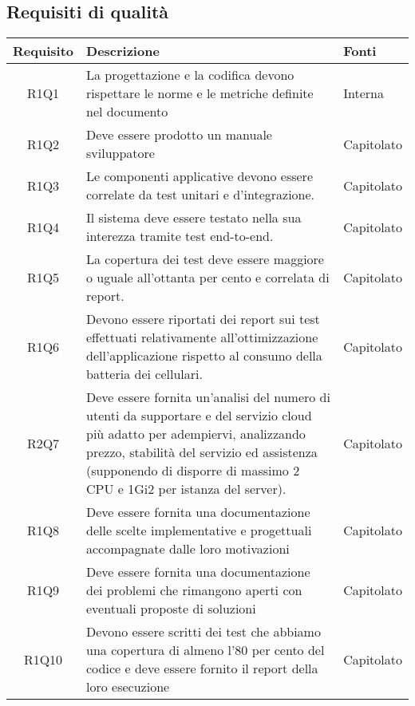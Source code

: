 \subsection{Requisiti di qualità}
\begin{center}
	\begin{longtable}{|c|p{10cm}|p{4cm}|}
		\hline
		\rowcolor{lighter-grayer}
		\textbf{Requisito} & \textbf{Descrizione} & \textbf{Fonti}  \\
		\hline
		\endhead
		
		 R1Q1 &La progettazione e la codifica devono rispettare le norme e le metriche definite nel documento \dext{Piano di qualifica v1.0.0} & Interna\\
		\hline	
		R1Q2 &Deve essere prodotto un manuale sviluppatore & Capitolato\\
		\hline
		R1Q3 &Le componenti applicative devono essere correlate da test unitari e d’integrazione. & Capitolato\\
		\hline
		R1Q4 &Il sistema deve essere testato nella sua interezza tramite test end-to-end. & Capitolato\\
		\hline
		R1Q5 &La copertura dei test deve essere maggiore o uguale all'ottanta per cento e correlata di report. & Capitolato\\
		\hline
		R1Q6 &Devono essere riportati dei report sui test effettuati relativamente all’ottimizzazione dell’applicazione rispetto al consumo della
		batteria dei cellulari. & Capitolato\\
		\hline
		R2Q7&	Deve essere fornita un'analisi del numero di utenti da supportare e del servizio cloud più adatto per adempiervi, analizzando prezzo, stabilità del servizio ed assistenza (supponendo di disporre di massimo 2 CPU e 1Gi2 per istanza del server).& Capitolato	\\
		\hline
		R1Q8&Deve essere fornita una documentazione delle scelte implementative e progettuali accompagnate dalle loro motivazioni	& Capitolato	\\
		\hline
		R1Q9	&Deve essere fornita una documentazione dei problemi che rimangono aperti con eventuali proposte di soluzioni	& Capitolato	\\
		\hline
		R1Q10&Devono essere scritti dei test che abbiamo una copertura di almeno l'80 per cento del codice e deve essere fornito il report della loro esecuzione	& 	Capitolato \\
		\hline
		

\end{longtable}
\end{center}
